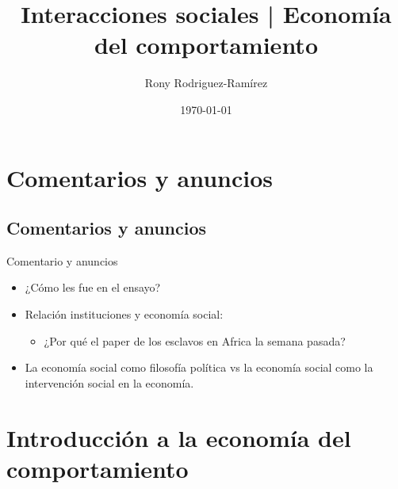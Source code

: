 \documentclass[11pt, aspectratio=169, compress]{beamer}
\title{Interacciones sociales | Economía del comportamiento}
\author{Rony Rodriguez-Ramírez}
\institute{Economía Social y Humana | Grupo B018 \\Universidad Centroamericana}
\date{\today}
\begin{document}
	
\begin{frame}[plain]
	\maketitle  
\end{frame}

\section{Comentarios y anuncios}
\subsection{Comentarios y anuncios}
\begin{frame}{Comentario y anuncios}
\begin{itemize}
	\item ¿Cómo les fue en el ensayo? 
	\item Relación instituciones y economía social: 
	\begin{itemize}
		\item ¿Por qué el paper de los esclavos en Africa la semana pasada? 
	\end{itemize}
	\item La economía social como filosofía política vs la economía social como la intervención social en la economía. 
\end{itemize}
\end{frame}
\section{Introducción a la economía del comportamiento}
\end{document}
